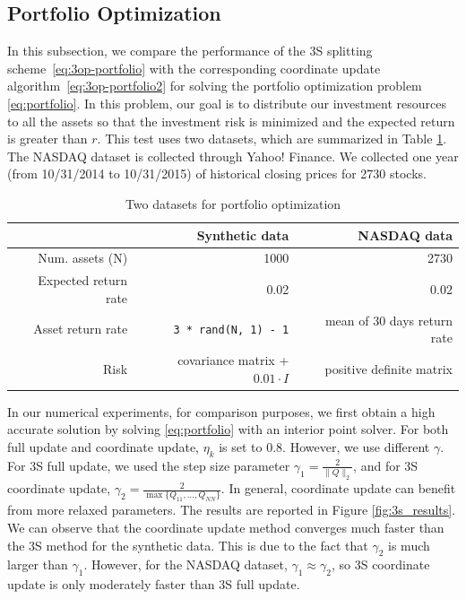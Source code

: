 \subsection{Portfolio Optimization}
In this subsection, we compare the performance of the 3S splitting scheme~\eqref{eq:3op-portfolio} with the corresponding coordinate update algorithm~\eqref{eq:3op-portfolio2} for solving the portfolio optimization problem \eqref{eq:portfolio}. In this problem, our goal is to distribute our investment resources to all the assets so that the investment risk is minimized and the expected return is greater than $r$. This test uses two datasets, which are summarized in Table \ref{tab:3s-data}. The NASDAQ dataset is collected through Yahoo! Finance. We collected one year (from 10/31/2014 to 10/31/2015) of historical closing prices for 2730 stocks. 

\begin{table}[htbp]
\centering
 \begin{tabular}{rrr}
  \toprule
    & Synthetic data  & NASDAQ data\\
   \midrule
   Num. assets (N) & 1000 & 2730 \\
   Expected return rate & 0.02 & 0.02 \\
   Asset return rate & \texttt{3 * rand(N, 1) - 1} & mean of 30 days return rate \\
   Risk & covariance matrix + $0.01\cdot I$ & positive definite matrix \\
   \bottomrule
\end{tabular}
 \caption{Two datasets for portfolio optimization \label{tab:3s-data}}
\end{table}

In our numerical experiments, for comparison purposes, we first obtain a high accurate solution by solving \eqref{eq:portfolio} with an interior point solver. For both full update and coordinate update, $\eta_k$ is set to 0.8. However, we use different $\gamma$. For 3S full update, we used the step size parameter $\gamma_1 = \frac{2}{\|Q\|_2}$, and for 3S coordinate update, $\gamma_2 = \frac{2}{\max\{Q_{11}, ..., Q_{NN}\}}$. In general, coordinate update can benefit from more relaxed parameters. The results are reported in Figure \ref{fig:3s_results}. We can observe that the coordinate update method converges much faster than the 3S method for the synthetic data. This is due to the fact that $\gamma_2$ is much larger than $\gamma_1$. However, for the NASDAQ dataset, $\gamma_1 \approx \gamma_2$, so 3S coordinate update is only moderately faster than 3S full update.

